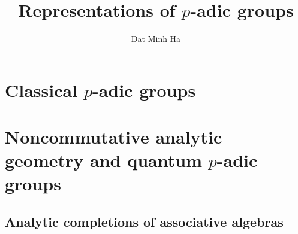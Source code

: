 

\setcounter{chapter}{-1}





	\title{Representations of \texorpdfstring{$p$}{}-adic groups}
	
	\author{Dat Minh Ha}
	\maketitle
	
	\begin{abstract}
	    
	\end{abstract}
	
	{
      \hypersetup{} 
      \dominitoc
      \tableofcontents %
    }
    
    \part{Classical \texorpdfstring{$p$}{}-adic groups}
    
    \part{Noncommutative analytic geometry and quantum \texorpdfstring{$p$}{}-adic groups}
        \chapter{Analytic completions of associative algebras}
            \begin{abstract}
                
            \end{abstract}
            
            \minitoc
            
            
            
            
            
            
	
	\printbibliography

